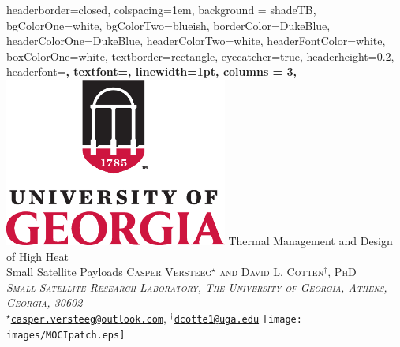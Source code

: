 \documentclass[landscape,archE,fontscale=0.32,columns=3]{Poster} %
\begin{document}
\begin{poster}
{
headerborder=closed, %
colspacing=1em, %
background = shadeTB,
bgColorOne=white, %
bgColorTwo=blueish, %
borderColor=DukeBlue, %
headerColorOne=DukeBlue, %
headerColorTwo=white, %
headerFontColor=white, %
boxColorOne=white, %
textborder=rectangle, %
eyecatcher=true, %
headerheight=0.2\textheight, %
headerfont=\Large\bf\textsc, %
textfont={\setlength{\parindent}{1.5em}}, %
linewidth=1pt, %
columns = 3,
}
%
{\includegraphics[height=15em]{images/UGAlogo.eps}} %
{\fontsize{32}{38.4}\selectfont Thermal Management and Design of High Heat\\ Small Satellite Payloads \vspace{0.5em}} %
{\textsc{Casper Versteeg$^\star$ and David L. Cotten$^\dagger$, PhD \\
\textit{Small Satellite Research Laboratory, The University of Georgia, Athens, Georgia, 30602}}\\ %
$^\star$\texttt{\href{mailto:casper.versteeg@outlook.com}{casper.versteeg@outlook.com}}, $^\dagger$\texttt{\href{mailto:dcotte1@uga.edu}{dcotte1@uga.edu}}}
{\texttt{[image: images/MOCIpatch.eps]}}


\end{poster}
\end{document}
